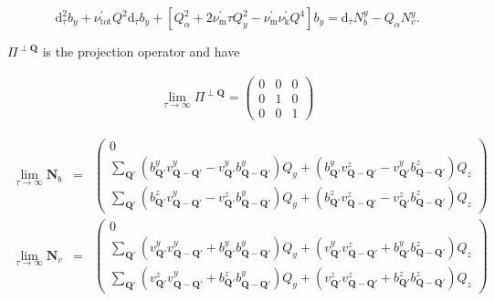 \documentclass[prb,singlecolumn]{revtex4}
\begin{document}
\begin{equation}
\label{bay_ivan}
\mathrm{d}^2_{\overline{\tau}}b_y + \nu_\mathrm{tot}^\prime Q^2\mathrm{d}_{\overline{\tau}}b_y + [Q^2_\alpha + 2\nu_\mathrm{m}^\prime \tau Q_y^2 -\nu_\mathrm{m}^\prime\nu_\mathrm{k}^\prime Q^4]b_y
= \mathrm{d}_{\overline{\tau}}N^y_b - Q_\alpha N_v^y.
\end{equation}

$\Pi^{\perp\mathbf{Q}}$ is the projection operator and have

\begin{eqnarray}
\lim\limits_{\tau \rightarrow \infty}{ \Pi^{\perp\mathbf{Q}} } = \left(\begin{array}{ccc}
 0 & 0 & 0 \\
 0 & 1 & 0 \\
 0 & 0 & 1 
\end{array} \right)
\end{eqnarray}

\begin{eqnarray}
 \lim\limits_{\tau \rightarrow \infty}{\mathbf{N}_b} &=&
\left(\begin{array}{c}
 0  \\
 \sum_{\mathbf{Q}'} (b_{\mathbf{Q}'}^yv_{\mathbf{Q}-\mathbf{Q}'}^y - v_{\mathbf{Q}'}^yb_{\mathbf{Q}-\mathbf{Q}'}^y)Q_y + (b_{\mathbf{Q}'}^yv_{\mathbf{Q}-\mathbf{Q}'}^z - v_{\mathbf{Q}'}^yb_{\mathbf{Q}-\mathbf{Q}'}^z)Q_z  \\
 \sum_{\mathbf{Q}'} (b_{\mathbf{Q}'}^zv_{\mathbf{Q}-\mathbf{Q}'}^y - v_{\mathbf{Q}'}^zb_{\mathbf{Q}-\mathbf{Q}'}^y)Q_y + (b_{\mathbf{Q}'}^zv_{\mathbf{Q}-\mathbf{Q}'}^z - v_{\mathbf{Q}'}^zb_{\mathbf{Q}-\mathbf{Q}'}^z)Q_z \end{array} \right) \\
  \lim\limits_{\tau \rightarrow \infty}{\mathbf{N}_v} &=&
\left(\begin{array}{c}
 0  \\
 \sum_{\mathbf{Q}'} (v_{\mathbf{Q}'}^yv_{\mathbf{Q}-\mathbf{Q}'}^y + b_{\mathbf{Q}'}^yb_{\mathbf{Q}-\mathbf{Q}'}^y)Q_y + (v_{\mathbf{Q}'}^yv_{\mathbf{Q}-\mathbf{Q}'}^z + b_{\mathbf{Q}'}^yb_{\mathbf{Q}-\mathbf{Q}'}^z)Q_z \\
 \sum_{\mathbf{Q}'} (v_{\mathbf{Q}'}^zv_{\mathbf{Q}-\mathbf{Q}'}^y + b_{\mathbf{Q}'}^zb_{\mathbf{Q}-\mathbf{Q}'}^y)Q_y + (v_{\mathbf{Q}'}^zv_{\mathbf{Q}-\mathbf{Q}'}^z + b_{\mathbf{Q}'}^zb_{\mathbf{Q}-\mathbf{Q}'}^z)Q_z \end{array} \right)
\end{eqnarray}
\end{document}
